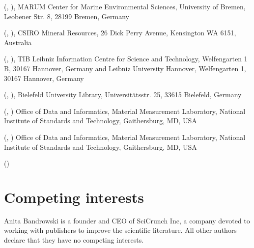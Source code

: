 \documentclass[a4paper,10pt,english]{sphinxmanual}
\begin{document}
\sphinxAtStartPar
{} (, ),
MARUM \sphinxhyphen{} Center for Marine Environmental Sciences, University of Bremen,
Leobener Str. 8, 28199 Bremen, Germany

\sphinxAtStartPar
{} (, ),
CSIRO Mineral Resources, 26 Dick Perry Avenue, Kensington WA 6151, Australia

\sphinxAtStartPar
{} (, ),
TIB \textendash{} Leibniz Information Centre for Science and Technology,
Welfengarten 1 B, 30167 Hannover, Germany and Leibniz University
Hannover, Welfengarten 1, 30167 Hannover, Germany

\sphinxAtStartPar
{} (, ),
Bielefeld University Library, Universitätsstr. 25, 33615 Bielefeld, Germany

\sphinxAtStartPar
{} (, )
Office of Data and Informatics, Material Measurement Laboratory,
National Institute of Standards and Technology, Gaithersburg, MD, USA

\sphinxAtStartPar
{} (, )
Office of Data and Informatics, Material Measurement Laboratory,
National Institute of Standards and Technology, Gaithersburg, MD, USA

\sphinxAtStartPar
{} ()


\section{Competing interests}
\label{\detokenize{white-paper/index:competing-interests}}
\sphinxAtStartPar
Anita Bandrowski is a founder and CEO of SciCrunch Inc, a company
devoted to working with publishers to improve the scientific
literature.  All other authors declare that they have no competing
interests.
\end{document}
